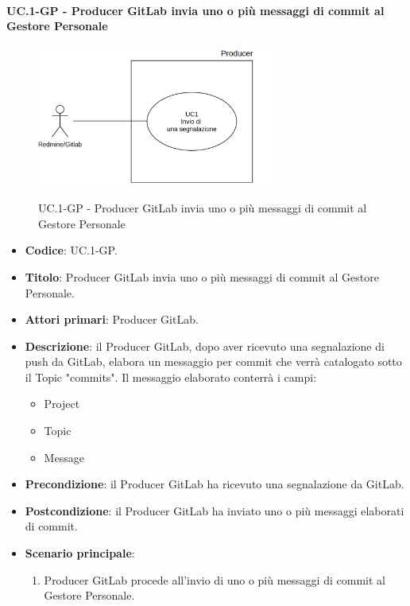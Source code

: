 	\paragraph{UC\theuccount.1-GP - Producer GitLab invia uno o più messaggi di commit al Gestore Personale}
		\begin{figure}[H]
			\centering
			\includegraphics[width=0.7\textwidth]{img/UC1.png}\\
			\caption{UC\theuccount.1-GP - Producer GitLab invia uno o più messaggi di commit al Gestore Personale}
		\end{figure}
		\begin{itemize}
			\item \textbf{Codice}: UC\theuccount.1-GP.
			\item \textbf{Titolo}: Producer GitLab invia uno o più messaggi di commit al Gestore Personale.
			\item \textbf{Attori primari}: Producer GitLab.
			\item \textbf{Descrizione}: il Producer GitLab, dopo aver ricevuto una segnalazione di push da GitLab,
			elabora un messaggio per commit che verrà catalogato sotto il Topic "commits".
			Il messaggio elaborato conterrà i campi:
			\begin{itemize}
				\item Project
				\item Topic
				\item Message
			\end{itemize}
			\item \textbf{Precondizione}: il Producer GitLab ha ricevuto una segnalazione da GitLab.
			\item \textbf{Postcondizione}: il Producer GitLab ha inviato uno o più messaggi elaborati di commit.
			\item \textbf{Scenario principale}: 
			\begin{enumerate}
				\item Producer GitLab procede all'invio di uno o più messaggi
			 di commit al Gestore Personale.
			\end{enumerate}
			
		\end{itemize}
	
